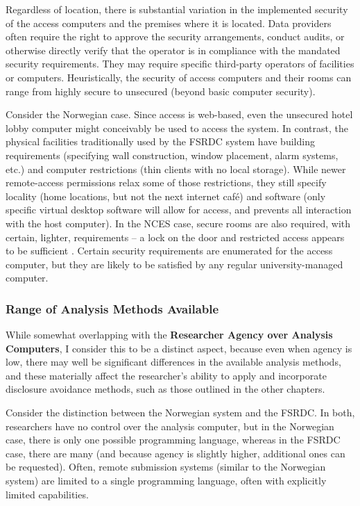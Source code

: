 Regardless of location, there is substantial variation in the implemented security of the access computers and the premises where it is located.  Data providers often require the right to approve the security arrangements, conduct audits, or otherwise directly verify that the operator is in compliance with the mandated security requirements. They may require specific third-party operators of facilities or computers. Heuristically, the security of access computers and their rooms can range from highly secure to unsecured (beyond basic computer security).

Consider the Norwegian case. Since access is web-based, even the unsecured hotel lobby computer might conceivably be used to access the system. In contrast, the physical facilities traditionally used by the FSRDC system have building requirements (specifying wall construction, window placement, alarm systems, etc.) and computer restrictions (thin clients with no local storage). While newer remote-access permissions relax some of those restrictions, they still specify locality (home locations, but not the next internet café) and software (only specific virtual desktop software will allow for access, and prevents all interaction with the host computer). In the NCES case, secure rooms are also required, with certain, lighter, requirements -- a lock on the door and restricted access appears to be sufficient \cite{national_center_for_education_statistics_appendix_nodate}. Certain security requirements are enumerated for the access computer, but they are likely to be satisfied by any regular university-managed computer.

\subsubsection{Range of Analysis Methods Available}

While somewhat overlapping with the \textbf{Researcher Agency over Analysis Computers}, I consider this to be a distinct aspect, because even when agency is low, there may well be significant differences in the available analysis methods, and these materially affect the researcher's ability to apply and incorporate disclosure avoidance methods, such as those outlined in the other chapters. 

Consider the distinction between the Norwegian system and the FSRDC. In both, researchers have no control over the analysis computer, but in the Norwegian case, there is only one possible programming language, whereas in the FSRDC case, there are many (and because agency is slightly higher, additional ones can be requested). Often, remote submission systems (similar to the Norwegian system) are limited to a single programming language, often with explicitly limited capabilities. 

